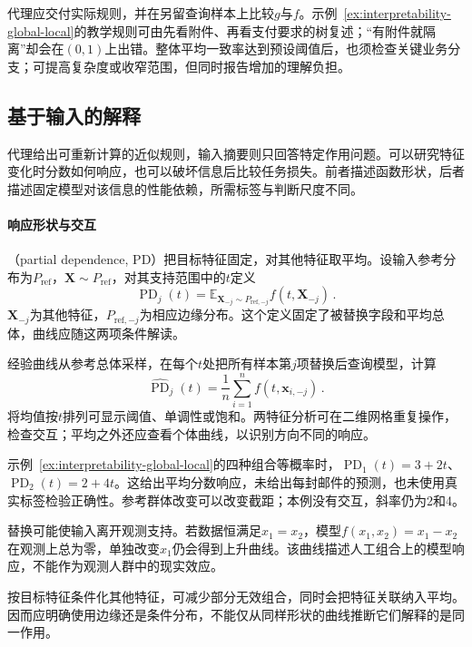 代理应交付实际规则，并在另留查询样本上比较$g$与$f$。示例~\ref{ex:interpretability-global-local}的教学规则可由先看附件、再看支付要求的树复述；“有附件就隔离”却会在$(0,1)$上出错。整体平均一致率达到预设阈值后，也须检查关键业务分支；可提高复杂度或收窄范围，但同时报告增加的理解负担。

\subsection{基于输入的解释}
\label{sec:interpretability-global-dependence}

代理给出可重新计算的近似规则，输入摘要则只回答特定作用问题。可以研究特征变化时分数如何响应，也可以破坏信息后比较任务损失。前者描述函数形状，后者描述固定模型对该信息的性能依赖，所需标签与判断尺度不同。

\paragraph{响应形状与交互}

（partial dependence, PD）把目标特征固定，对其他特征取平均。设输入参考分布为$P_{\mathrm{ref}}$，$\bm X\sim P_{\mathrm{ref}}$，对其支持范围中的$t$定义
\[
 \operatorname{PD}_j(t)
 =\mathbb E_{\bm X_{-j}\sim P_{\mathrm{ref},-j}}
 f(t,\bm X_{-j})\, .
\]
$\bm X_{-j}$为其他特征，$P_{\mathrm{ref},-j}$为相应边缘分布。这个定义固定了被替换字段和平均总体，曲线应随这两项条件解读。

经验曲线从参考总体采样，在每个$t$处把所有样本第$j$项替换后查询模型，计算
\[
 \widehat{\operatorname{PD}}_j(t)
 =\frac1n\sum_{i=1}^n f(t,\bm{x}_{i,-j})\, .
\]
将均值按$t$排列可显示阈值、单调性或饱和。两特征分析可在二维网格重复操作，检查交互；平均之外还应查看个体曲线，以识别方向不同的响应。

示例~\ref{ex:interpretability-global-local}的四种组合等概率时，$\operatorname{PD}_1(t)=3+2t$、$\operatorname{PD}_2(t)=2+4t$。这给出平均分数响应，未给出每封邮件的预测，也未使用真实标签检验正确性。参考群体改变可以改变截距；本例没有交互，斜率仍为2和4。

替换可能使输入离开观测支持。若数据恒满足$x_1=x_2$，模型$f(x_1,x_2)=x_1-x_2$在观测上总为零，单独改变$x_1$仍会得到上升曲线。该曲线描述人工组合上的模型响应，不能作为观测人群中的现实效应。

按目标特征条件化其他特征，可减少部分无效组合，同时会把特征关联纳入平均。因而应明确使用边缘还是条件分布，不能仅从同样形状的曲线推断它们解释的是同一作用。


